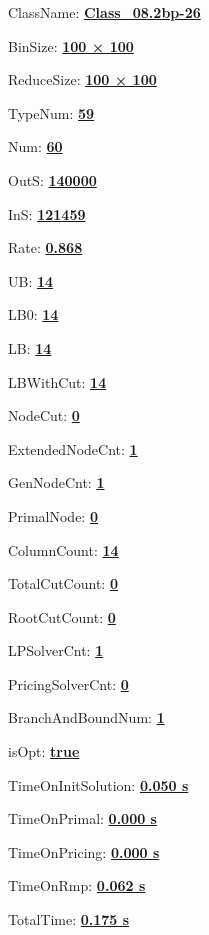 \documentclass[11pt]{article}
\begin{document}
\pagestyle{empty}


ClassName: \underline{\textbf{Class_08.2bp-26}}
\par
BinSize: \underline{\textbf{100 × 100}}
\par
ReduceSize: \underline{\textbf{100 × 100}}
\par
TypeNum: \underline{\textbf{59}}
\par
Num: \underline{\textbf{60}}
\par
OutS: \underline{\textbf{140000}}
\par
InS: \underline{\textbf{121459}}
\par
Rate: \underline{\textbf{0.868}}
\par
UB: \underline{\textbf{14}}
\par
LB0: \underline{\textbf{14}}
\par
LB: \underline{\textbf{14}}
\par
LBWithCut: \underline{\textbf{14}}
\par
NodeCut: \underline{\textbf{0}}
\par
ExtendedNodeCnt: \underline{\textbf{1}}
\par
GenNodeCnt: \underline{\textbf{1}}
\par
PrimalNode: \underline{\textbf{0}}
\par
ColumnCount: \underline{\textbf{14}}
\par
TotalCutCount: \underline{\textbf{0}}
\par
RootCutCount: \underline{\textbf{0}}
\par
LPSolverCnt: \underline{\textbf{1}}
\par
PricingSolverCnt: \underline{\textbf{0}}
\par
BranchAndBoundNum: \underline{\textbf{1}}
\par
isOpt: \underline{\textbf{true}}
\par
TimeOnInitSolution: \underline{\textbf{0.050 s}}
\par
TimeOnPrimal: \underline{\textbf{0.000 s}}
\par
TimeOnPricing: \underline{\textbf{0.000 s}}
\par
TimeOnRmp: \underline{\textbf{0.062 s}}
\par
TotalTime: \underline{\textbf{0.175 s}}
\par
\newpage


\end{document}
